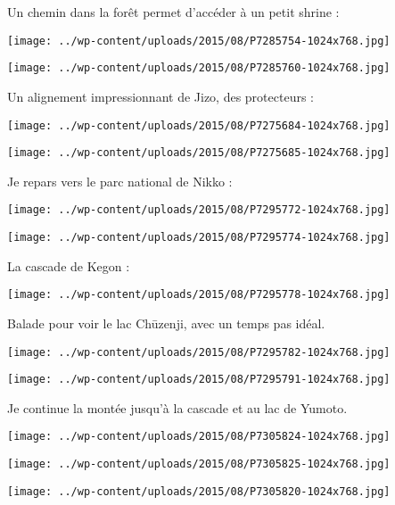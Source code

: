 \pagebreak
 Un chemin dans la forêt permet d'accéder à un petit shrine :
\begin{center} \texttt{[image: ../wp-content/uploads/2015/08/P7285754-1024x768.jpg]} \end{center}
\begin{center} \texttt{[image: ../wp-content/uploads/2015/08/P7285760-1024x768.jpg]} \end{center}

\pagebreak
 Un alignement impressionnant de Jizo, des protecteurs :
\begin{center} \texttt{[image: ../wp-content/uploads/2015/08/P7275684-1024x768.jpg]} \end{center}
\begin{center} \texttt{[image: ../wp-content/uploads/2015/08/P7275685-1024x768.jpg]} \end{center}

\pagebreak
 Je repars vers le parc national de Nikko :
\begin{center} \texttt{[image: ../wp-content/uploads/2015/08/P7295772-1024x768.jpg]} \end{center}
\begin{center} \texttt{[image: ../wp-content/uploads/2015/08/P7295774-1024x768.jpg]} \end{center}

\pagebreak
 La cascade de Kegon :
\begin{center} \texttt{[image: ../wp-content/uploads/2015/08/P7295778-1024x768.jpg]} \end{center}

 Balade pour voir le lac Chūzenji, avec un temps pas idéal. 
\begin{center} \texttt{[image: ../wp-content/uploads/2015/08/P7295782-1024x768.jpg]} \end{center}
\begin{center} \texttt{[image: ../wp-content/uploads/2015/08/P7295791-1024x768.jpg]} \end{center}

 Je continue la montée jusqu'à la cascade et au lac de Yumoto. 
\begin{center} \texttt{[image: ../wp-content/uploads/2015/08/P7305824-1024x768.jpg]} \end{center}
\begin{center} \texttt{[image: ../wp-content/uploads/2015/08/P7305825-1024x768.jpg]} \end{center}
\begin{center} \texttt{[image: ../wp-content/uploads/2015/08/P7305820-1024x768.jpg]} \end{center}

